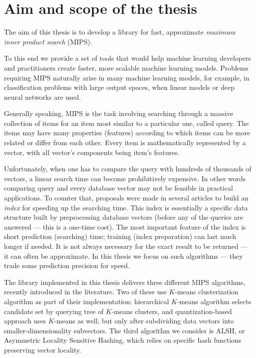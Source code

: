 \section{Aim and scope of the thesis}

The aim of this thesis is to develop a library for fast,
approximate \textit{maximum inner product search} (MIPS).

To this end we provide a set of tools that would help machine
learning developers and practitioners create faster, more scalable machine learning models.
Problems requiring MIPS naturally arise in many machine learning models, for example, in
classification problems with large output spaces, when linear models or deep neural networks are used.

Generally speaking, MIPS is the task involving searching through a massive collection of items for
an item most similar to a particular one, called query. The items may have many properties (features)
according to which items can be more related or differ from each other.
Every item is mathematically represented by a vector, with all vector's components being item's features.

Unfortunately, when one has to compare the query with hundreds of thousands of vectors,
a linear search time can become prohibitively expensive.
In other words comparing query and every database vector may not be feasible in practical applications.
To counter that, proposals were made in several articles to build an \textit{index} for speeding
up the searching time.
This index is essentially a specific data structure built by preprocessing database vectors (before
any of the queries are answered --- this is a one-time cost).
The most important feature of the index is short prediction (searching) time; training (index preparation)
can last much longer if needed.
It is not always necessary for the exact result to be returned --- it can often be approximate.
In this thesis we focus on such algorithms --- they trade some prediction precision for speed.

The library implemented in this thesis delivers three different MIPS algorithms,
recently introduced in the literature.
Two of these use $K$-means clusterization algorithm as part of their implementation: hierarchical $K$-means algorithm
selects candidate set by querying tree of $K$-means clusters, and quantization-based approach uses $K$-means as well, 
but only after subdividing data vectors into smaller-dimensionality subvectors. The third algorithm we consider
is ALSH, or Asymmetric Locality Sensitive Hashing, which relies on specific hash functions preserving
vector locality.

